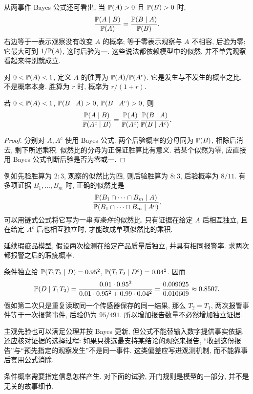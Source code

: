 从两事件 Bayes 公式还可看出, 当 $\mathbb P(A)>0$ 且 $\mathbb P(B)>0$ 时,
\[
 \frac{\mathbb P(A\mid B)}{\mathbb P(A)}=\frac{\mathbb P(B\mid A)}{\mathbb P(B)}.
\]
右边等于一表示观察没有改变 $A$ 的概率; 等于零表示观察与 $A$ 不相容, 后验为零; 它最大可到 $1/\mathbb P(A)$, 这时后验为一. 这些说法都依赖模型中的似然, 并不单凭观察看起来特别就成立.

对 $0<\mathbb P(A)<1$, 定义 $A$ 的胜算为 $\mathbb P(A)/\mathbb P(A^c)$. 它是发生与不发生的概率之比, 不是概率本身. 胜算为 $r$ 时, 概率为 $r/(1+r)$.

\begin{proposition}[胜算更新]
若 $0<\mathbb P(A)<1$, $\mathbb P(B\mid A)>0$, $\mathbb P(B\mid A^c)>0$, 则
\[
 \frac{\mathbb P(A\mid B)}{\mathbb P(A^c\mid B)}
 =\frac{\mathbb P(A)}{\mathbb P(A^c)}
 \frac{\mathbb P(B\mid A)}{\mathbb P(B\mid A^c)}.
\]
\end{proposition}
\begin{proof}
分别对 $A,A^c$ 使用 Bayes 公式. 两个后验概率的分母同为 $\mathbb P(B)$, 相除后消去, 剩下所述乘积. 似然比的分母为正保证胜算比有意义. 若某个似然为零, 应直接用 Bayes 公式判断后验是否为零或一.
\end{proof}
例如先验胜算为 $2:3$, 观察的似然比为四, 则后验胜算为 $8:3$, 后验概率为 $8/11$. 有多项证据 $B_1,\ldots,B_m$ 时, 正确的似然比是
\[
 \frac{\mathbb P(B_1\cap\cdots\cap B_m\mid A)}
 {\mathbb P(B_1\cap\cdots\cap B_m\mid A^c)}.
\]
可以用链式公式将它写为一串\emph{有条件}的似然比. 只有证据在给定 $A$ 后相互独立, 且在给定 $A^c$ 后也相互独立时, 才能改成单项似然比的乘积.

\begin{example}
延续瑕疵品模型, 假设两次检测在给定产品质量后独立, 并具有相同报警率. 求两次都报警之后的瑕疵概率.
\end{example}
\begin{solution}
条件独立给 $\mathbb P(T_1T_2\mid D)=0.95^2$, $\mathbb P(T_1T_2\mid D^c)=0.04^2$. 因而
\[
 \mathbb P(D\mid T_1T_2)=
 \frac{0.01\cdot0.95^2}{0.01\cdot0.95^2+0.99\cdot0.04^2}
 =\frac{0.009025}{0.010609}\approx0.8507.
\]
假如第二次只是重复读取同一个传感器保存的同一结果, 那么 $T_2=T_1$, 两次报警事件等于一次报警事件, 后验仍为 $95/491$. 所以增加报告数量不必然增加独立证据.
\end{solution}
主观先验也可以满足公理并按 Bayes 更新, 但公式不能替输入数字提供事实依据. 还应核对证据的选择过程: 如果只挑选最支持某结论的观察来报告, ``收到这份报告''与``预先指定的观察发生''不是同一事件. 这类偏差应写进观测机制, 而不能靠事后套用公式消除.

条件概率需要指定信息怎样产生. 对下面的试验, 开门规则是模型的一部分, 并不是无关的故事细节.

